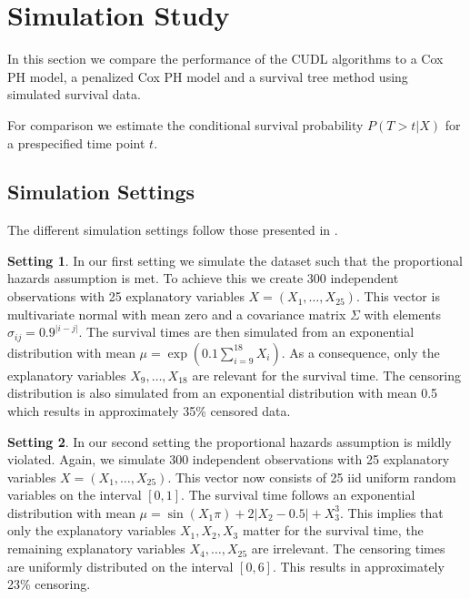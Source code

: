 \documentclass[12pt, a4paper]{scrartcl}
\theoremstyle{definition}
\newtheorem{setting}{Setting}
\theoremstyle{plain}
\numberwithin{equation}{section}
\numberwithin{figure}{section}
\numberwithin{table}{section}
\begin{document}
	\newpage

	\section{Simulation Study} \label{simulation}
	In this section we compare the performance of the CUDL algorithms to a Cox PH model, a penalized Cox PH model and a survival tree method using simulated survival data.
	
	For comparison we estimate the conditional survival probability $P(T>t\vert X)$ for a prespecified time point $t$.
	
	\subsection{Simulation Settings}\label{settings}

	The different simulation settings follow those presented in \citet*{culs}.
	
	\begin{setting}
		In our first setting we simulate the dataset such that the proportional hazards assumption is met.
		To achieve this we create 300 independent observations with 25 explanatory variables $X=(X_1,\dots,X_{25})$.
		This vector is multivariate normal with mean zero and a covariance matrix $\Sigma$ with elements $\sigma_{ij}=0.9^{\vert i-j\vert}$.
		The survival times are then simulated from an exponential distribution with mean $\mu = \exp\left(0.1\sum_{i=9}^{18}X_i\right)$.
		As a consequence, only the explanatory variables $X_9,\dots,X_{18}$ are relevant for the survival time.
		The censoring distribution is also simulated from an exponential distribution with mean 0.5 which results in approximately 35\% censored data.
	\end{setting}

	\begin{setting}		
		In our second setting the proportional hazards assumption is mildly violated.
		Again, we simulate 300 independent observations with 25 explanatory variables $X=(X_1,\dots, X_{25})$.
		This vector now consists of 25 iid uniform random variables on the interval $[0,1]$.
		The survival time follows an exponential distribution with mean $\mu = \sin(X_1\pi)+2\vert X_2-0.5\vert + X_3^3$.
		This implies that only the explanatory variables $X_1,X_2,X_3$ matter for the survival time, the remaining explanatory variables $X_4,\dots,X_{25}$ are irrelevant.
		The censoring times are uniformly distributed on the interval $[0,6]$.
		This results in approximately 23\% censoring.
	\end{setting}
		
\end{document}
